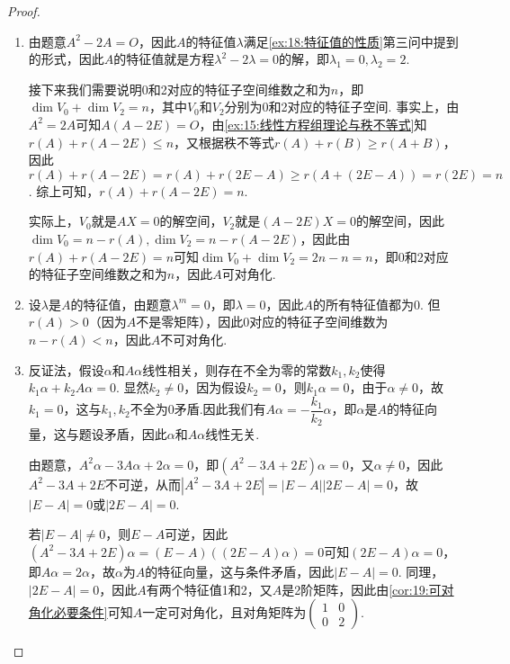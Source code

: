 \begin{proof}
    \begin{enumerate}
        \item 由题意$A^2-2A=O$，因此$A$的特征值$\lambda$满足\autoref{ex:18:特征值的性质}第三问中提到的形式，因此$A$的特征值就是方程$\lambda^2-2\lambda=0$的解，即$\lambda_1=0,\lambda_2=2$.

        接下来我们需要说明0和2对应的特征子空间维数之和为$n$，即$\dim V_0+\dim V_2=n$，其中$V_0$和$V_2$分别为0和2对应的特征子空间. 事实上，由$A^2=2A$可知$A(A-2E)=O$，由\autoref{ex:15:线性方程组理论与秩不等式}知$r(A)+r(A-2E)\leqslant n$，又根据秩不等式$r(A)+r(B)\geqslant r(A+B)$，因此$r(A)+r(A-2E)=r(A)+r(2E-A)\geqslant r(A+(2E-A))=r(2E)=n$. 综上可知，$r(A)+r(A-2E)=n$.

        实际上，$V_0$就是$AX=0$的解空间，$V_2$就是$(A-2E)X=0$的解空间，因此$\dim V_0=n-r(A),\dim V_2=n-r(A-2E)$，因此由$r(A)+r(A-2E)=n$可知$\dim V_0+\dim V_2=2n-n=n$，即0和2对应的特征子空间维数之和为$n$，因此$A$可对角化.

        \item 设$\lambda$是$A$的特征值，由题意$\lambda^m=0$，即$\lambda=0$，因此$A$的所有特征值都为0. 但$r(A)>0$（因为$A$不是零矩阵），因此0对应的特征子空间维数为$n-r(A)<n$，因此$A$不可对角化.

        \item 反证法，假设$\alpha$和$A\alpha$线性相关，则存在不全为零的常数$k_1,k_2$使得$k_1\alpha+k_2A\alpha=0$. 显然$k_2\neq 0$，因为假设$k_2=0$，则$k_1\alpha=0$，由于$\alpha\neq 0$，故$k_1=0$，这与$k_1,k_2$不全为0矛盾.因此我们有$A\alpha=-\dfrac{k_1}{k_2}\alpha$，即$\alpha$是$A$的特征向量，这与题设矛盾，因此$\alpha$和$A\alpha$线性无关.

        由题意，$A^2\alpha-3A\alpha+2\alpha=0$，即$(A^2-3A+2E)\alpha=0$，又$\alpha\neq 0$，因此$A^2-3A+2E$不可逆，从而$|A^2-3A+2E|=|E-A||2E-A|=0$，故$|E-A|=0$或$|2E-A|=0$.

        若$|E-A|\neq 0$，则$E-A$可逆，因此$(A^2-3A+2E)\alpha=(E-A)((2E-A)\alpha)=0$可知$(2E-A)\alpha=0$，即$A\alpha=2\alpha$，故$\alpha$为$A$的特征向量，这与条件矛盾，因此$|E-A|=0$. 同理，$|2E-A|=0$，因此$A$有两个特征值1和2，又$A$是2阶矩阵，因此由\autoref{cor:19:可对角化必要条件}可知$A$一定可对角化，且对角矩阵为$\begin{pmatrix}
                1 & 0 \\
                0 & 2
            \end{pmatrix}$.
    \end{enumerate}
\end{proof}

